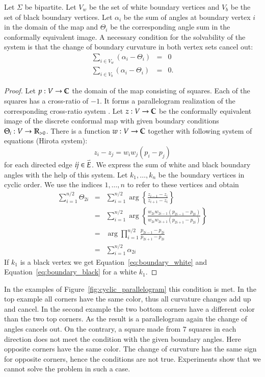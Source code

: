 \documentclass[Thesis]{subfiles}
\begin{document}
\begin{theorem}
Let $\Sigma$ be bipartite. Let $V_w$ be the set of white boundary vertices and $V_b$ be the set of black boundary vertices.
Let $\alpha_i$ be the sum of angles at boundary vertex $i$ in the domain of the map and $\Theta_i$ be the corresponding angle sum in the conformally equivalent image.
A necessary condition for the solvability of the system is that the change of boundary curvature in both vertex sets cancel out:
\begin{eqnarray}
\sum_{i\in V_w}(\alpha_i - \Theta_i) &=& 0\label{eq:boundary_white}\\
\sum_{i\in V_b}(\alpha_i - \Theta_i) &=& 0\label{eq:boundary_black}.
\end{eqnarray}
\end{theorem}

\begin{proof}
Let $p:V\to \mathbb C$ the domain of the map consisting of squares. Each of the squares has a cross-ratio of $-1$. 
It forms a parallelogram realization of the corresponding cross-ratio system \cite[pp. 311--318]{BobenkoSuris2008}. 
Let $z:V\to \mathbb C$ be the conformally equivalent image of the discrete conformal map with given boundary conditions $\Theta_i:V\to \mathbb R_{>0}$. 
There is a function $w:V\to \mathbb C$ together with following system of equations (Hirota system):
\begin{equation*}
z_i-z_j=w_iw_j(p_i-p_j)
\end{equation*}
for each directed edge $\it ij \in \accentset{\rightharpoonup}{E}$.
We express the sum of white and black boundary angles with the help of this system. 
Let $k_1,\ldots,k_n$ be the boundary vertices in cyclic order.
We use the indices $1,\ldots,n$ to refer to these vertices and obtain
\begin{eqnarray*}
\sum_{i=1}^{n/2}\Theta_{2i} &=&\sum_{i=1}^{n/2}\arg\left\{\frac{z_{i-1}-z_i}{z_{i+1}-z_i}\right\}\\
&=&\sum_{i=1}^{n/2}\arg\left\{\frac{w_{2i}w_{2i-1}(p_{2i-1}-p_{2i})}{w_{2i}w_{2i+1}(p_{2i+1}-p_{2i})}\right\}\\
&=&\arg\prod_{i=1}^{n/2}\frac{p_{2i-1}-p_{2i}}{p_{2i+1}-p_{2i}}\\
&=&\sum_{i=1}^{n/2}\alpha_{2i}
\end{eqnarray*}
If $k_1$ is a black vertex we get Equation~\ref{eq:boundary_white} and Equation~\ref{eq:boundary_black} for a white $k_1$.
\end{proof}

In the examples of Figure~\ref{fig:cyclic_parallelogram} this condition is met. 
In the top example all corners have the same color, thus all curvature changes add up and cancel.
In the second example the two bottom corners have a different color than the two top corners.
As the result is a parallelogram again the change of angles cancels out.
On the contrary, a square made from $7$ squares in each direction does not meet the condition with the given boundary angles.
Here opposite corners have the same color.
The change of curvature has the same sign for opposite corners, hence the conditions are not true.
Experiments show that we cannot solve the problem in such a case.
\end{document}
